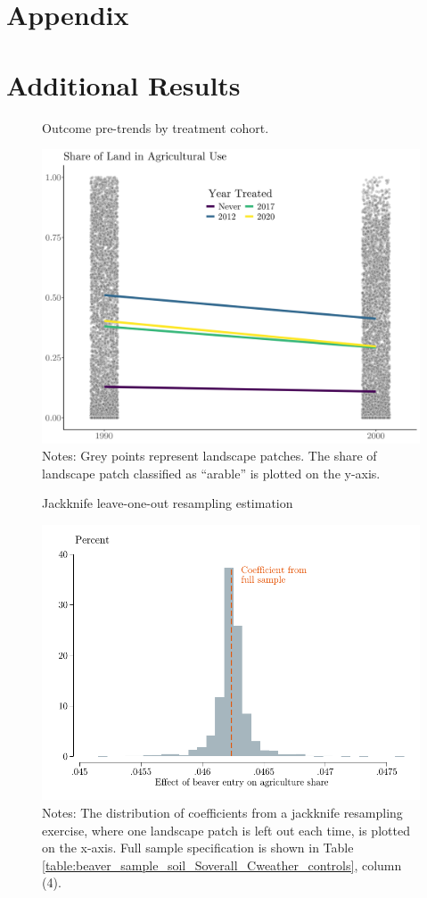 \documentclass[11pt, english, letterpaper]{article}
\begin{document}
\section*{Appendix}
\section{Additional Results}
\label{sec:addl_results}

%
%


\begin{figure}
    \centering
    \caption{Outcome pre-trends by treatment cohort.}
    \includegraphics[width=0.7\linewidth]{output/figures/outcome_pretrends.png}
    \caption*{\justifying \footnotesize Notes: Grey points represent landscape patches. The share of landscape patch classified as ``arable'' is plotted on the y-axis.}
    \label{fig:outcome-pretrends}
\end{figure}

\begin{figure}
    \centering
    \caption{Jackknife leave-one-out resampling estimation}
    \includegraphics[width=0.7\linewidth]{output/figures/jackknife_distribution_Soverall_river_cells_AC.pdf}
    \caption*{\justifying \footnotesize Notes: The distribution of coefficients from a jackknife resampling exercise, where one landscape patch is left out each time, is plotted on the x-axis. Full sample specification is shown in Table \ref{table:beaver_sample_soil_Soverall_Cweather_controls}, column (4). }
    \label{fig:est-main-jackknife}
\end{figure}
\end{document}
